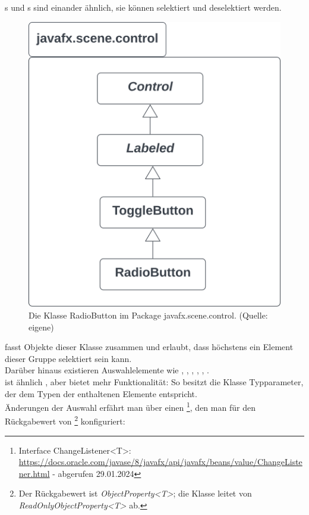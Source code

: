 \noindent
{}s und s sind einander ähnlich, sie können selektiert und deselektiert werden.


\begin{figure}
    \centering
    \includegraphics[scale=0.5]{chapters/fopt3/img/javafx/radiobutton}
    \caption{Die Klasse RadioButton im Package javafx.scene.control. (Quelle: eigene)}
    \label{fig:radiobutton}
\end{figure}

\noindent
{} fasst Objekte dieser Klasse zusammen und erlaubt, dass höchstens ein Element dieser Gruppe selektiert sein kann.\\

\noindent
Darüber hinaus existieren Auswahlelemente wie , , , , , .\\

\noindent
{} ist ähnlich , aber bietet mehr Funktionalität: So besitzt die Klasse Typparameter, der dem Typen der enthaltenen Elemente entspricht.\\
Änderungen der Auswahl erfährt man über einen \footnote{
    Interface ChangeListener<T>: \url{https://docs.oracle.com/javase/8/javafx/api/javafx/beans/value/ChangeListener.html} - abgerufen 29.01.2024
}, den man für den Rückgabewert von \footnote{
Der Rückgabewert ist \textit{ObjectProperty<T>}; die Klasse leitet von \textit{ReadOnlyObjectProperty<T>} ab.
} konfiguriert:

